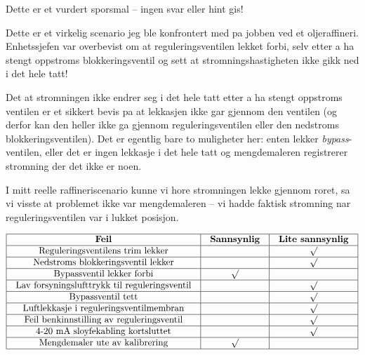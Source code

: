 
Dette er et vurdert sporsmal -- ingen svar eller hint gis!







Dette er et virkelig scenario jeg ble konfrontert med pa jobben ved et oljeraffineri.  Enhetssjefen var overbevist om at reguleringsventilen lekket forbi, selv etter a ha stengt oppstroms blokkeringsventil og sett at stromningshastigheten ikke gikk ned i det hele tatt!

Det at stromningen ikke endrer seg i det hele tatt etter a ha stengt oppstroms ventilen er et sikkert bevis pa at lekkasjen ikke gar gjennom den ventilen (og derfor kan den heller ikke ga gjennom reguleringsventilen eller den nedstroms blokkeringsventilen).  Det er egentlig bare to muligheter her: enten lekker {\it bypass}-ventilen, eller det er ingen lekkasje i det hele tatt og mengdemaleren registrerer stromning der det ikke er noen.

I mitt reelle raffineriscenario kunne vi hore stromningen lekke gjennom roret, sa vi visste at problemet ikke var mengdemaleren -- vi hadde faktisk stromning nar reguleringsventilen var i lukket posisjon.


$$\vbox{\offinterlineskip
\halign{\strut
\vrule \quad\hfil # \ \hfil & 
\vrule \quad\hfil # \ \hfil & 
\vrule \quad\hfil # \ \hfil \vrule \cr
\noalign{\hrule}
%
{\bf Feil} & {\bf Sannsynlig} & {\bf Lite sannsynlig} \cr
%
\noalign{\hrule}
%
Reguleringsventilens trim lekker &  & $\surd$ \cr
%
\noalign{\hrule}
%
Nedstroms blokkeringsventil lekker &  & $\surd$ \cr
%
\noalign{\hrule}
%
Bypassventil lekker forbi & $\surd$  & \cr
%
\noalign{\hrule}
%
Lav forsyningslufttrykk til reguleringsventil &  & $\surd$ \cr
%
\noalign{\hrule}
%
Bypassventil tett &  & $\surd$ \cr
%
\noalign{\hrule}
%
Luftlekkasje i reguleringsventilmembran &  & $\surd$ \cr
%
\noalign{\hrule}
%
Feil benkinnstilling av reguleringsventil &  & $\surd$ \cr
%
\noalign{\hrule}
%
4-20 mA sloyfekabling kortsluttet &  & $\surd$ \cr
%
\noalign{\hrule}
%
Mengdemaler ute av kalibrering & $\surd$  & \cr
%
\noalign{\hrule}
} %
}$$ %






